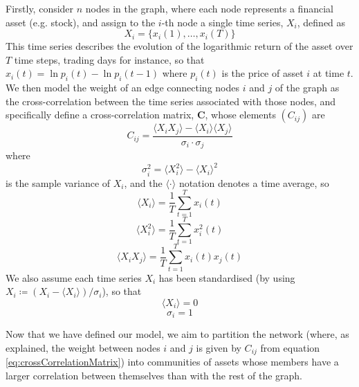 \documentclass[12pt]{article}
\numberwithin{equation}{section}
\newcommand*\matvar[1]{\mathbf#1}
\newcommand*\mean[1]{\langle#1\rangle}
\begin{document}
Firstly, consider $n$ nodes in the graph, where each node represents a financial asset (e.g. stock), and assign to the $i$-th node a single time series, $X_{i}$, defined as
\begin{equation}
\label{eq:singleTimeSeries}
	X_{i} = \{x_{i}(1),\dots,x_{i}(T)\}
\end{equation}
This time series describes the evolution of the logarithmic return of the asset over $T$ time steps, trading days for instance, so that $x_{i}(t) = \ln p_{i}(t) - \ln p_{i}(t-1)$ where $p_{i}(t)$ is the price of asset $i$ at time $t$. We then model the weight of an edge connecting nodes $i$ and $j$ of the graph as the cross-correlation between the time series associated with those nodes, and specifically define a cross-correlation matrix, $\matvar{C}$, whose elements $(C_{ij})$ are
\begin{equation}
\label{eq:crossCorrelationMatrix}
	C_{ij} = \frac{\mean{X_{i} X_{j}} - \mean{X_{i}} \mean{X_{j}}}{\sigma_{i} \cdot \sigma_{j}}
\end{equation}
where
\begin{equation}
\label{eq:temporalVariance}
	\sigma_{i}^{2} = \mean{X_{i}^{2}} - \mean{X_{i}}^{2}
\end{equation}
is the sample variance of $X_{i}$, and the $\mean{\cdot}$ notation denotes a time average, so
\begin{equation}
\label{eq:temporalMean}
	\mean{X_{i}} = \frac{1}{T} \sum_{t=1}^{T} x_{i}(t)
\end{equation}
\begin{equation}
\label{eq:temporalMeanSquare}
	\mean{X_{i}^{2}} = \frac{1}{T} \sum_{t=1}^{T} x_{i}^{2}(t)
\end{equation}
\begin{equation}
\label{eq:temporalMeanProduct}
	\mean{X_{i}X_{j}} = \frac{1}{T} \sum_{t=1}^{T} x_{i}(t)x_{j}(t)
\end{equation}
We also assume each time series $X_{i}$ has been standardised (by using $X_{i} \coloneqq (X_{i} - \mean{X_{i}}) / \sigma_{i}$), so that
\begin{equation}
\label{eq:zeroTemporalMean}
	\mean{X_{i}} = 0
\end{equation}
\begin{equation}
\label{eq:unitTemporalVariance}
	\sigma_{i} = 1
\end{equation}

Now that we have defined our model, we aim to partition the network (where, as explained, the weight between nodes $i$ and $j$ is given by $C_{ij}$ from equation \eqref{eq:crossCorrelationMatrix}) into communities of assets whose members have a larger correlation between themselves than with the rest of the graph.
\end{document}
